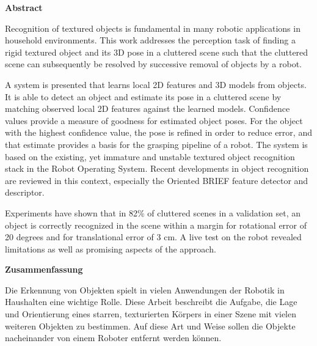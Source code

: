 

\clearemptydoublepage
{}	

\vspace*{2cm}
\begin{center}
{\Large \bf Abstract}
\end{center}
\vspace{1cm}

Recognition of textured objects is fundamental in many robotic applications in
household environments. This work addresses the perception task of finding a
rigid textured object and its 3D pose in a cluttered scene such that the
cluttered scene can subsequently be resolved by successive removal of objects
by a robot.

A system is presented that learns local 2D features and 3D models from objects.
It is able to detect an object and estimate its pose in a cluttered scene by
matching observed local 2D features against the learned models.  Confidence
values provide a measure of goodness for estimated object poses. For the object
with the highest confidence value, the pose is refined in order to reduce
error, and that estimate provides a basis for the grasping pipeline of a robot.
The system is based on the existing, yet immature and unstable textured object
recognition stack in the Robot Operating System. Recent developments in object
recognition are reviewed in this context, especially the Oriented BRIEF feature
detector and descriptor.

Experiments have shown that in 82\% of cluttered scenes in a validation set, an
object is correctly recognized in the scene within a margin for rotational
error of 20 degrees and for translational error of 3 cm.  A live test on the robot
revealed limitations as well as promising aspects of the approach.

\clearemptydoublepage
{}

\vspace*{2cm}
\begin{center}
{\Large \bf Zusammenfassung}
\end{center}
\vspace{1cm}


Die Erkennung von Objekten spielt in vielen Anwendungen der Robotik in
Haushalten eine wichtige Rolle. Diese Arbeit beschreibt die Aufgabe, die Lage
und Orientierung eines starren, texturierten Körpers in einer Szene mit vielen
weiteren Objekten zu bestimmen. Auf diese Art und Weise sollen die Objekte
nacheinander von einem Roboter entfernt werden können.

